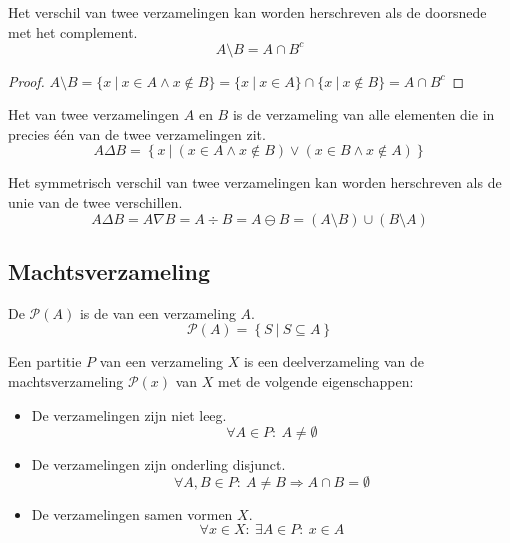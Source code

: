 \documentclass[main.tex]{subfiles}
\begin{document}
\begin{st}
  Het verschil van twee verzamelingen kan worden herschreven als de doorsnede met het complement.
  \[ A \setminus B = A \cap B^{c} \]
  \begin{proof}
    $A \setminus B = \{ x\ |\ x \in A \wedge x \not\in B \} = \{ x\ |\ x \in A \} \cap \{ x\ |\ x \not\in B \} = A \cap B^{c}$
  \end{proof}
\end{st}


\begin{de}
  Het  van twee verzamelingen $A$ en $B$ is de verzameling van alle elementen die in precies \'e\'en van de twee verzamelingen zit.
  \[ A \Delta B = \left\{ x\ |\ (x \in A \wedge x \not\in B) \vee (x \in B \wedge x \not\in A) \right\} \]
\end{de}

\begin{st}
  Het symmetrisch verschil van twee verzamelingen kan worden herschreven als de unie van de twee verschillen.
  \[ A \Delta B = A \nabla B = A \div B = A \ominus B = (A \setminus B) \cup (B \setminus A) \]
\end{st}

\subsection{Machtsverzameling}
\label{sec:machtsverzameling}

\begin{de}
  \label{de:machtsverzameling}
  De  $\mathcal P(A)$ is de  van een verzameling $A$.
  \[ \mathcal P(A) = \left\{ S\ |\ S \subseteq A \right\} \]
\end{de}

\begin{de}
  \label{de:partitie}
  Een partitie $P$ van een verzameling $X$ is een deelverzameling van de machtsverzameling $\mathcal {P}(x)$ van $X$ met de volgende eigenschappen:
  \begin{itemize}
  \item De verzamelingen zijn niet leeg.
    \[ \forall A \in P:\ A \neq \emptyset \]
  \item De verzamelingen zijn onderling disjunct.
    \[ \forall A,B \in P:\ A \neq B \Rightarrow A \cap B = \emptyset \]
  \item De verzamelingen samen vormen $X$.
    \[ \forall x \in X:\ \exists A \in P:\ x \in A \]
  \end{itemize}
\end{de}
\end{document}
